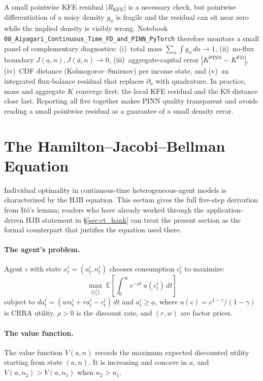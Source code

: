 \documentclass[11pt,a4paper]{report}
\newcommand{\E}[1]{\mathbb{E}\!\left[#1\right]}
\begin{document}
\begin{remarkbox}
A small pointwise KFE residual $|R_{\text{KFE}}|$ is a necessary check, but pointwise differentiation of a noisy density $g_\phi$ is fragile and the residual can sit near zero while the implied density is visibly wrong.  Notebook \texttt{08\_Aiyagari\_Continuous\_Time\_FD\_and\_PINN\_PyTorch} therefore monitors a small panel of complementary diagnostics: (i)~total mass $\sum_n\int g_\phi\,da \to 1$, (ii)~no-flux boundary $J(\underline a, n), J(\bar a, n) \to 0$, (iii)~aggregate-capital error $|K^{\text{PINN}} - K^{\text{FD}}|$, (iv)~CDF distance (Kolmogorov--Smirnov) per income state, and (v)~an integrated flux-balance residual that replaces $\partial_a$ with quadrature.  In practice, mass and aggregate $K$ converge first; the local KFE residual and the KS distance close last.  Reporting all five together makes PINN quality transparent and avoids reading a small pointwise residual as a guarantee of a small density error.
\end{remarkbox}

\section{The Hamilton--Jacobi--Bellman Equation}
\label{sec:hjb_theory}

Individual optimality in continuous-time heterogeneous-agent models is characterized by the HJB equation.  This section gives the full five-step derivation from Itô's lemma; readers who have already worked through the application-driven HJB statement in \S\ref{sec:ct_hank} can treat the present section as the formal counterpart that justifies the equation used there.

\paragraph{The agent's problem.}  Agent $i$ with state $x_t^i = (a_t^i, n_t^i)$ chooses consumption $c_t^i$ to maximize:
\begin{equation}
\max_{\{c_t^i\}} \;\E{\int_0^\infty e^{-\rho t}\,u(c_t^i)\,dt}
\label{eq:hjb_agent}
\end{equation}
subject to $da_t^i = (wn_t^i + ra_t^i - c_t^i)\,dt$ and $a_t^i \geq \underline{a}$, where $u(c) = c^{1-\gamma}/(1-\gamma)$ is CRRA utility, $\rho > 0$ is the discount rate, and $(r,w)$ are factor prices.

\paragraph{The value function.}  The value function $V(a,n)$ records the maximum expected discounted utility starting from state $(a,n)$.  It is increasing and concave in $a$, and $V(a,n_2) > V(a,n_1)$ when $n_2 > n_1$.
\end{document}
